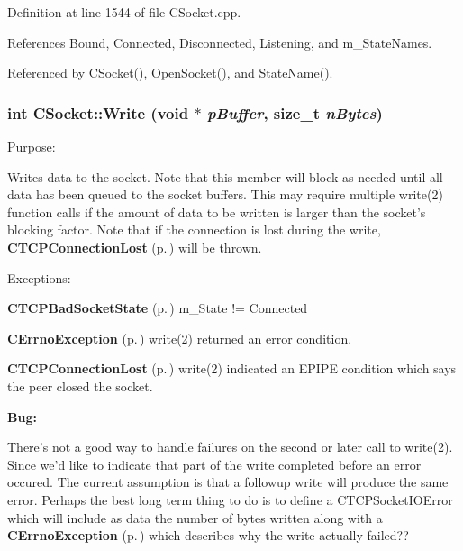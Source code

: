 Definition at line 1544 of file CSocket.cpp.

References Bound, Connected, Disconnected, Listening, and m\_\-State\-Names.

Referenced by CSocket(), Open\-Socket(), and State\-Name().
\subsubsection{\setlength{\rightskip}{0pt plus 5cm}int CSocket::Write (void $\ast$ {\em p\-Buffer}, size\_\-t {\em n\-Bytes})}\label{classCSocket_a12}


Purpose:

Writes data to the socket. Note that this member will block as needed until all data has been queued to the socket buffers. This may require multiple write(2) function calls if the amount of data to be written is larger than the socket's blocking factor. Note that if the connection is lost during the write, {\bf CTCPConnection\-Lost} {\rm (p.\,\pageref{classCTCPConnectionLost})} will be thrown.

Exceptions:\begin{CompactItemize}
\item 
{\bf CTCPBad\-Socket\-State} {\rm (p.\,\pageref{classCTCPBadSocketState})} m\_\-State != Connected\item 
{\bf CErrno\-Exception} {\rm (p.\,\pageref{classCErrnoException})} write(2) returned an error condition.\item 
{\bf CTCPConnection\-Lost} {\rm (p.\,\pageref{classCTCPConnectionLost})} write(2) indicated an EPIPE condition which says the peer closed the socket. 

\end{CompactItemize}
\begin{Desc}
\item[{\bf Bug: }]\par
There's not a good way to handle failures on the second or later call to write(2). Since we'd like to indicate that part of the write completed before an error occured. The current assumption is that a followup write will produce the same error. Perhaps the best long term thing to do is to define a CTCPSocket\-IOError which will include as data the number of bytes written along with a {\bf CErrno\-Exception} {\rm (p.\,\pageref{classCErrnoException})} which describes why the write actually failed??\end{Desc}
 

